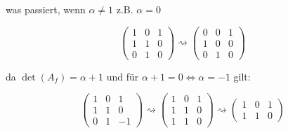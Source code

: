 \documentclass[main.tex]{subfiles}
\begin{document}
was passiert, wenn $\alpha \neq 1$ z.B. $\alpha = 0$

$$
    \begin{pmatrix}
        1 & 0 & 1 \\
        1 & 1 & 0 \\
        0 & 1 & 0
    \end{pmatrix}
    \rightsquigarrow
    \begin{pmatrix}
        0 & 0 & 1 \\
        1 & 0 & 0 \\
        0 & 1 & 0
    \end{pmatrix}
$$

da $\det (A_f) = \alpha + 1$ und für $\alpha + 1 = 0 \Leftrightarrow \alpha = -1$ gilt:

$$
    \begin{pmatrix}
        1 & 0 & 1 \\
        1 & 1 & 0 \\
        0 & 1 & -1
    \end{pmatrix}
    \rightsquigarrow
    \begin{pmatrix}
        1 & 0 & 1 \\
        1 & 1 & 0 \\
        1 & 1 & 0
    \end{pmatrix}
    \rightsquigarrow
    \begin{pmatrix}
        1 & 0 & 1 \\
        1 & 1 & 0
    \end{pmatrix}
$$
\end{document}

